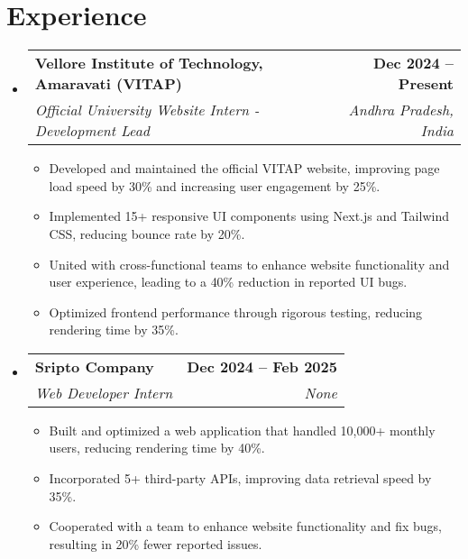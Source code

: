\documentclass[letterpaper,11pt]{article}
\makeatletter
\newcommand{\resumeItem}[1]{
  \item\small{
    {#1 \vspace{-2pt}}
  }
}
\newcommand{\resumeSubheading}[4]{
  \vspace{-2pt}\item
    \begin{tabular*}{1.0\textwidth}[t]{l@{\extracolsep{\fill}}r}
      \textbf{#1} & \textbf{\small #2} \\
      \textit{\small#3} & \textit{\small #4} \\
    \end{tabular*}\vspace{-7pt}
}
\newcommand{\resumeSubHeadingListStart}{\begin{itemize}[leftmargin=0.0in, label={}]}
\newcommand{\resumeSubHeadingListEnd}{\end{itemize}}
\newcommand{\resumeItemListStart}{\begin{itemize}}
\newcommand{\resumeItemListEnd}{\end{itemize}\vspace{-5pt}}
\makeatother
\begin{document}
\section{Experience}
  \resumeSubHeadingListStart

    \resumeSubheading
      {Vellore Institute of Technology, Amaravati (VITAP)}{Dec 2024 -- Present}
      {Official University Website Intern - Development Lead}{Andhra Pradesh, India}
      \resumeItemListStart
        \resumeItem{Developed and maintained the official VITAP website, improving page load speed by 30\% and increasing user engagement by 25\%.}
        \resumeItem{Implemented 15+ responsive UI components using Next.js and Tailwind CSS, reducing bounce rate by 20\%.}
        \resumeItem{United with cross-functional teams to enhance website functionality and user experience, leading to a 40\% reduction in reported UI bugs.}
        \resumeItem{Optimized frontend performance through rigorous testing, reducing rendering time by 35\%.}
      \resumeItemListEnd

    \resumeSubheading
      {Sripto Company}{Dec 2024 -- Feb 2025}
      {Web Developer Intern}{None}
      \resumeItemListStart
        \resumeItem{Built and optimized a web application that handled 10,000+ monthly users, reducing rendering time by 40\%.}
        \resumeItem{Incorporated 5+ third-party APIs, improving data retrieval speed by 35\%.}
        \resumeItem{Cooperated with a team to enhance website functionality and fix bugs, resulting in 20\% fewer reported issues.}
      \resumeItemListEnd

  \resumeSubHeadingListEnd
\vspace{-16pt}



\end{document}
